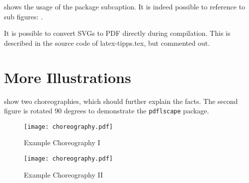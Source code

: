  shows the usage of the package subcaption.
It is indeed possible to reference to sub figures: .

It is possible to convert SVGs to PDF directly during compilation.
This is described in the source code of latex-tipps.tex, but commented out.

\iffalse %
  The SVG in \cref{fig:directSVG} is directly included, while the text in the SVG in \cref{fig:latexSVG} is set using pdflatex.
  If you want to see the graphics, inkscape must be in PATH and in the text source \texttt{\textbackslash{}iffalse} and \text{\textbackslash{}iftrue} have to be commented out.

  \begin{figure}
    \centering
    \texttt{[image: svgexample.svg]}
    \caption{SVG directly included}
    \label{fig:directSVG}
  \end{figure}

  \begin{figure}
    \centering
    \def\svgwidth{.4\textwidth}
    
    \caption{Text in SVN set via \LaTeX{}}
    \label{fig:latexSVG}
  \end{figure}
\fi %



\section{More Illustrations}
 show two choreographies, which should further explain the facts. The second figure is rotated 90 degrees to demonstrate the \texttt{pdflscape} package.

\begin{figure}
  \centering
  \texttt{[image: choreography.pdf]}
  \caption{Example Choreography I}
  \label{fig:AnhangsChor}
\end{figure}

\begin{landscape}
  \begin{figure}
    \centering
    \texttt{[image: choreography.pdf]}
    \caption{Example Choreography II}
    \label{fig:AnhangsChor2}
  \end{figure}
\end{landscape}


